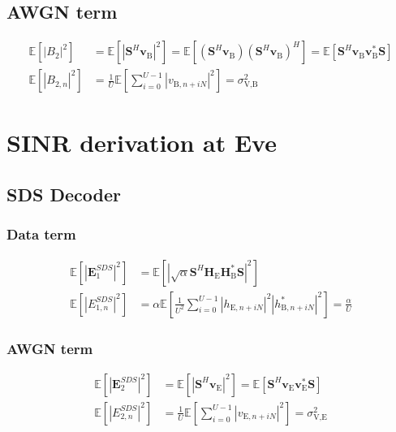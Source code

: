\documentclass[12pt, draftclsnofoot, onecolumn]{IEEEtran}
\newcommand{\module}[1]{\left|#1\right|}
\newcommand{\EX}[1]{\mathbb{E} \left[#1\right]}%
\newcommand{\HE}{\textbf{H}_{\text{E}}}
\newcommand{\HB}{\textbf{H}_{\text{B}}}
\newcommand{\vb}{\textbf{v}_{\text{B}}}
\newcommand{\ve}{\textbf{v}_{\text{E}}}
\newcommand{\spread}{\textbf{S}}
\begin{document}
\subsection{AWGN term}\label{sec:awgn-term-app}
\begin{equation}
	\begin{split}
		\EX{|B_2|^2} &=  \EX{\module{\spread^H \vb}^2} = \EX{\left(\spread^H \vb \right)\left(\spread^H \vb \right)^H} =\EX{\spread^H \vb \vb^* \spread } \\
		\EX{|B_{2,n}|^2} &= \frac{1}{U} \EX{\sum_{i=0}^{U-1} |v_{\text{B}, n + iN}|^2} = \sigma^2_{\text{V,B}}
	\end{split}
	\label{eq:appA:noise_bob-app}
\end{equation}





\section{SINR derivation at Eve}\label{sec:at-the-unintended-position-app}
\subsection{SDS Decoder}\label{sec:same-decoding-structure-as-bob-app}
\subsubsection{Data term}\label{sec:data-term-app-1}
\begin{equation}
	\begin{split}
		\EX{|\textbf{E}_{1}^{SDS}|^2} &= \EX{\module{\sqrt{\alpha}\spread^H \HE\HB^* \spread}^2} \\
		\EX{|E_{1,n}^{SDS}|^2}&=\alpha \EX{\frac{1}{U^2} \sum_{i=0}^{U-1} \left| h_{\text{E}, n + iN} \right|^2 \left| h^*_{\text{B}, n + iN}\right|^2 } = \frac{\alpha}{U}
	\end{split}
	\label{eq:appA:data_eve_filt0-app}
\end{equation}



\subsubsection{AWGN term}\label{sec:awgn-term-app-1}
\begin{equation}
	\begin{split}
		\EX{|\textbf{E}_{2}^{SDS}|^2} &=  \EX{\module{\spread^H \ve}^2} =\EX{\spread^H \ve \ve^* \spread } \\
		\EX{|E_{2,n}^{SDS}|^2} &= \frac{1}{U} \EX{\sum_{i=0}^{U-1} |v_{\text{E}, n + iN}|^2} = \sigma^2_{\text{V,E}}
	\end{split}
	\label{eq:appA:noise_eve_filt0-app}
\end{equation}
\end{document}
